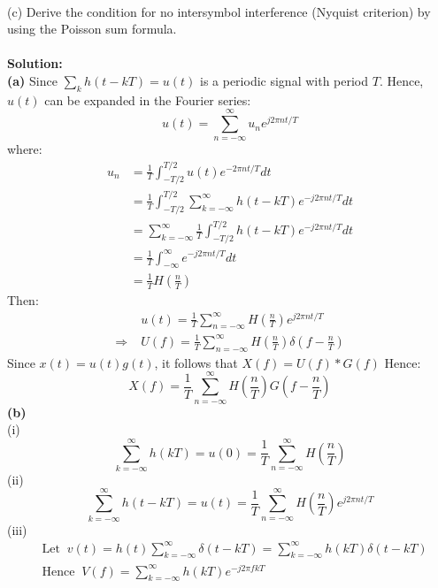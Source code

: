 \documentclass[a4paper,12pt]{article}
\begin{document}
\begin{enumerate}
\begin{align*}
            \end{align*}
            (c) Derive the condition for no intersymbol interference (Nyquist criterion) by using the Poisson sum formula. \\ \\
            \textbf{Solution:} \\
            \textbf{(a)} 
            Since $\sum_{k} h(t - kT) = u(t)$ is a periodic signal with period $T$. Hence, $u(t)$ can be expanded in the Fourier series: $$u(t) = \sum_{n = -\infty}^{\infty} u_{n}e^{j2 \pi nt/T}$$ where:
            \begin{align*}
                u_n &= \frac{1}{T} \int_{-T/2}^{T/2} u(t)e^{-2\pi nt/T}dt \\
                    &= \frac{1}{T} \int_{-T/2}^{T/2} \sum_{k = -\infty}^{\infty} h(t - kT) e^{-j2 \pi nt/T}dt \\
                    &= \sum_{k = -\infty}^{\infty} \frac{1}{T} \int_{-T/2}^{T/2} h(t - kT) e^{-j2 \pi nt/T} dt \\
                    &= \frac{1}{T} \int_{-\infty}^{\infty} e^{-j2 \pi nt/T}dt \\ 
                    &= \frac{1}{T} H(\frac{n}{T}) 
            \end{align*}
            Then:
            \begin{align*}
                &u(t) = \frac{1}{T} \sum_{n = -\infty}^{\infty} H(\frac{n}{T})e^{j2\pi nt/T} \\ 
                \Rightarrow \; & U(f) = \frac{1}{T} \sum_{n = -\infty}^{\infty} H(\frac{n}{T}) \delta(f - \frac{n}{T})
            \end{align*}
            Since $x(t) = u(t)g(t)$, it follows that $X(f) = U(f) * G(f)$ Hence: $$X(f) = \frac{1}{T} \sum_{n = -\infty}^{\infty} H(\frac{n}{T}) G(f - \frac{n}{T})$$ 
            \textbf{(b)} \\
            (i) $$\sum_{k = -\infty}^{\infty} h(kT) = u(0) = \frac{1}{T} \sum_{n = -\infty}^{\infty} H(\frac{n}{T})$$ 
            (ii) $$\sum_{k = -\infty}^{\infty} h(t - kT) = u(t) = \frac{1}{T} \sum_{n = -\infty}^{\infty} H(\frac{n}{T}) e^{j2\pi nt/T}$$ 
            (iii) 
            \begin{align*}
                & \text{Let} \;\; v(t) = h(t)\sum_{k = -\infty}^{\infty} \delta(t - kT) = \sum_{k = -\infty}^{\infty} h(kT) \delta(t - kT) \\ 
                & \text{Hence} \;\; V(f) = \sum_{k = -\infty}^{\infty} h(kT) e^{-j2\pi fkT} \\ 

\end{align*}
\end{enumerate}
\end{document}
